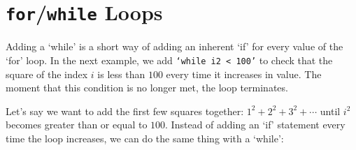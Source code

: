 \section{\texttt{for}/\texttt{while} Loops}
\label{sec:for_while_loops}


Adding a `while' is a short way of adding an inherent `if' for every value of the `for' loop. In the next example, we add \texttt{`while i2 < 100'} to check that the square of the index $i$ is less than $100$ every time it increases in value. The moment that this condition is no longer met, the loop terminates.

Let's say we want to add the first few squares together: $1^2+2^2+3^2+\cdots$ until $i^2$ becomes greater than or equal to $100$. Instead of adding an `if' statement every time the loop increases, we can do the same thing with a `while':

